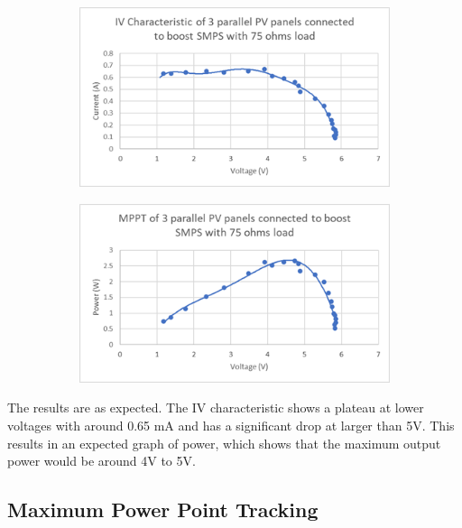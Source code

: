 \begin{figure}
    \centering
    \begin{subfigure}[b]{.45\linewidth}
        \includegraphics[width=\linewidth]{images/iv-3-load.png}
    \end{subfigure}
    \begin{subfigure}[b]{.45\linewidth}
        \includegraphics[width=\linewidth]{images/mppt-3-load.png}
    \end{subfigure}
    \caption{}
    \label{fig:mppt-load}
\end{figure}

The results are as expected. The IV characteristic shows a plateau at lower voltages with around 0.65 mA and has a significant drop at larger than 5V. This results in an expected graph of power, which shows that the maximum output power would be around 4V to 5V.

\subsection{Maximum Power Point Tracking}

